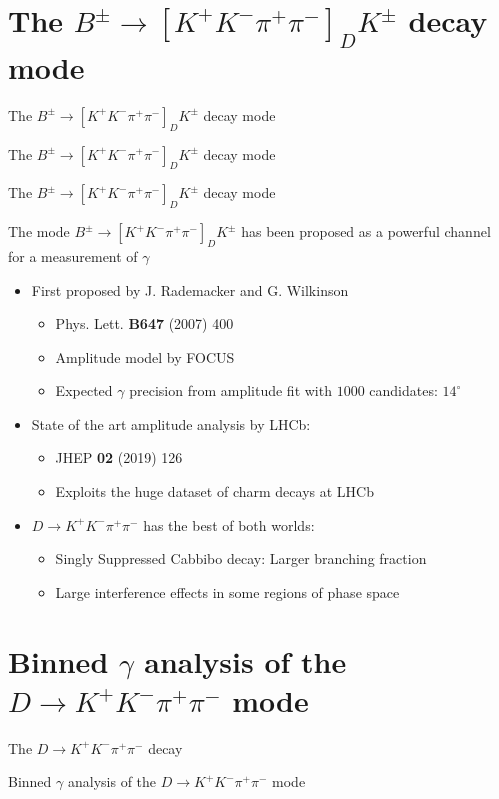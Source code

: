 \documentclass{beamer}
\begin{document}
\section{The \texorpdfstring{$B^\pm\to[K^+K^-\pi^+\pi^-]_DK^\pm$}{B2DK_D2KKpipi} decay mode}
\begin{frame}{The $B^\pm\to[K^+K^-\pi^+\pi^-]_DK^\pm$ decay mode}
  \begin{center}
    {\huge The $B^\pm\to[K^+K^-\pi^+\pi^-]_DK^\pm$ decay mode}
  \end{center}
\end{frame}

\begin{frame}{The $B^\pm\to[K^+K^-\pi^+\pi^-]_DK^\pm$ decay mode}
  \begin{center}
    \Large The mode $B^\pm\to[K^+K^-\pi^+\pi^-]_DK^\pm$ has been proposed as a powerful channel for a measurement of $\gamma$
  \end{center}
  \begin{itemize}
    \setlength\itemsep{1.2em}
    \item{First proposed by J. Rademacker and G. Wilkinson}
    \begin{itemize}
      \item{Phys. Lett. \textbf{B647} (2007) 400}
      \item{Amplitude model by FOCUS}
      \item{Expected $\gamma$ precision from amplitude fit with $1000$ candidates: $14^\circ$}
    \end{itemize}
    \item{State of the art amplitude analysis by LHCb:}
    \begin{itemize}
      \item{JHEP \textbf{02} (2019) 126}
      \item{Exploits the huge dataset of charm decays at LHCb}
    \end{itemize}
    \item{$D\to K^+K^-\pi^+\pi^-$ has the best of both worlds:}
    \begin{itemize}
      \item{Singly Suppressed Cabbibo decay: Larger branching fraction}
      \item{Large interference effects in some regions of phase space}
    \end{itemize}
  \end{itemize}
\end{frame}

\section{Binned \texorpdfstring{$\gamma$}{gamma} analysis of the \texorpdfstring{$D\to K^+K^-\pi^+\pi^-$}{D->KKpipi} mode}
\begin{frame}{The $D\to K^+K^-\pi^+\pi^-$ decay}
  \begin{center}
    {\huge Binned $\gamma$ analysis of the $D\to K^+K^-\pi^+\pi^-$ mode}
  \end{center}
\end{frame}
\end{document}
